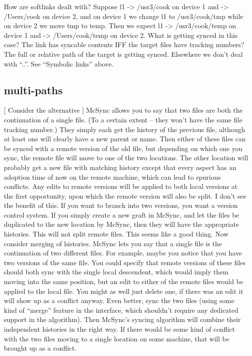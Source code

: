 \documentclass{book}
\begin{document}
How are softlinks dealt with?  Suppose l1 -> /usr3/cook on device 1 and -> /Users/cook on device 2, and on device 1 we change l1 to /usr3/cook/tmp while on device 2 we move tmp to temp.  Then we expect l1 -> /usr3/cook/temp on device 1 and -> /Users/cook/temp on device 2.  What is getting synced in this case?  The link has syncable contents IFF the target files have tracking numbers?  The full or relative path of the target is getting synced.  Elsewhere we don't deal with ``..''.  See ``Symbolic links'' above.


\subsection{multi-paths}

[ Consider the alternative ]
  McSync allows you to say that two files are both the continuation of a single file.  (To a certain extent -- they won't have the same file tracking number.)  They simply each get the history of the previous file, although at least one will clearly have a new parent or name.  Then either of these files can be synced with a remote version of the old file, but depending on which one you sync, the remote file will move to one of the two locations.  The other location will probably get a new file with matching history except that every aspect has an adoption time of now on the remote machine, which can lead to spurious conflicts.  Any edits to remote versions will be applied to both local versions at the first opportunity, upon which the remote version will also be split.
  I don't see the benefit of this.  If you want to branch into two versions, you want a version control system.
If you simply create a new graft in McSync, and let the files be duplicated to the new location by McSync, then they will have the appropriate histories.  This will not split remote files.  This seems like a good thing.
  Now consider merging of histories.
McSync lets you say that a single file is the continuation of two different files.  For example, maybe you notice that you have two versions of the same file.  You could specify that remote versions of these files should both sync with the single local descendent, which would imply them moving into the same position, but an edit to either of the remote files would be applied to the local file.
  You might as well just delete one, if there was an edit it will show up as a conflict anyway.  Even better, sync the two files (using some kind of ``merge'' feature in the interface, which shouldn't require any dedicated support in the algorithm).  Then McSync's syncing algorithm will combine their independent histories in the right way.  If there would be some kind of conflict with the two files moving to a single location on some machine, that will be brought up as a conflict.
\end{document}
